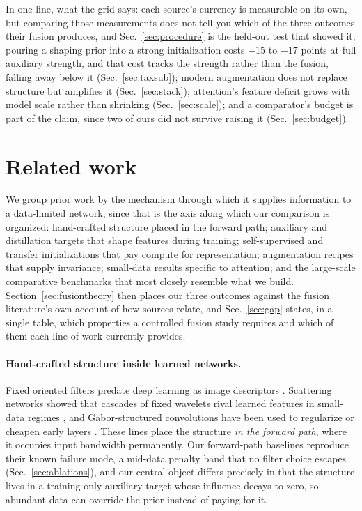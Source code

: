  In one line, what the grid says: each source's currency is
measurable on its own, but comparing those measurements does not tell you
which of the three outcomes their fusion produces, and
Sec.~\ref{sec:procedure} is the held-out test that showed it; pouring a
shaping prior into a strong initialization costs $-15$ to $-17$ points at full
auxiliary strength, and that cost tracks the strength rather than the fusion,
falling away below it (Sec.~\ref{sec:taxsub}); modern augmentation does not
replace structure but amplifies it (Sec.~\ref{sec:stack}); attention's feature
deficit grows with model scale rather than shrinking (Sec.~\ref{sec:scale});
and a comparator's budget is part of the claim, since two of ours did not
survive raising it (Sec.~\ref{sec:budget}).

\section{Related work}\label{sec:related}

 We group prior work by the mechanism through which it supplies
information to a data-limited network, since that is the axis along which our
comparison is organized: hand-crafted structure placed in the forward path;
auxiliary and distillation targets that shape features during training;
self-supervised and transfer initializations that pay compute for
representation; augmentation recipes that supply invariance; small-data results
specific to attention; and the large-scale comparative benchmarks that most
closely resemble what we build. Section~\ref{sec:fusiontheory} then places our
three outcomes against the
fusion literature's own account of how sources relate, and
Sec.~\ref{sec:gap} states, in a single table, which properties a controlled
fusion study requires and which of them each line of work currently provides.

\paragraph{Hand-crafted structure inside learned networks.} Fixed oriented
filters predate deep learning as image descriptors \citep{dalal2005hog}.
Scattering networks showed that cascades of fixed wavelets rival learned
features in small-data regimes \citep{bruna2013scattering}, and
Gabor-structured convolutions have been used to regularize or cheapen early
layers \citep{luan2018gaborcnn}. These lines place the structure \emph{in the
forward path}, where it occupies input bandwidth permanently. Our forward-path
baselines reproduce their known failure mode, a mid-data penalty band that no
filter choice escapes (Sec.~\ref{sec:ablations}), and our central object
differs precisely in that the structure lives in a training-only auxiliary
target whose influence decays to zero, so abundant data can override the prior
instead of paying for it.

